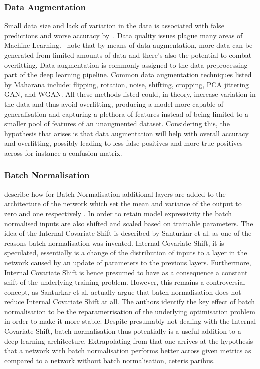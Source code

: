 \subsubsection{Data Augmentation}\label{augmentationtheory}
Small data size and lack of variation in the data is associated with false predictions and worse accuracy by~\citeauthor{maharana2022review}. Data quality issues plague many areas of Machine Learning.~\citeauthor{maharana2022review} note that by means of data augmentation, more data can be generated from limited amounts of data and there's also the potential to combat overfitting. Data augmentation is commonly assigned to the data preprocessing part of the deep learning pipeline. Common data augmentation techniques listed by Maharana include: flipping, rotation, noise, shifting, cropping, PCA jittering GAN, and WGAN\@. All these methods listed could, in theory, increase variation in the data and thus avoid overfitting, producing a model more capable of generalisation and capturing a plethora of features instead of being limited to a smaller pool of features of an unaugmented dataset. Considering this, the hypothesis that arises is that data augmentation will help with overall accuracy and overfitting, possibly leading to less false positives and more true positives across for instance a confusion matrix\@.

\subsubsection{Batch Normalisation}\label{batchnormtheory}
\citeauthor{santurkar2018does} describe how for Batch Normalisation additional layers are added to the architecture of the network which set the mean and variance of the output to zero and one respectively \citep{santurkar2018does}. In order to retain model expressivity the batch normalised inputs are also shifted and scaled based on trainable parameters. The idea of the Internal Covariate Shift is described by Santurkar et al\@. as one of the reasons batch normalisation was invented. Internal Covariate Shift, it is speculated, essentially is a change of the distribution of inputs to a layer in the network caused by an update of parameters to the previous layers. Furthermore, Internal Covariate Shift is hence presumed to have as a consequence a constant shift of the underlying training problem. However, this remains a controversial concept, as Santurkar et al\@. actually argue that batch normalisation does not reduce Internal Covariate Shift at all. The authors identify the key effect of batch normalisation to be the reparametrisation of the underlying optimisation problem in order to make it more stable. Despite presumably not dealing with the Internal Covariate Shift, batch normalisation thus potentially is a useful addition to a deep learning architecture. Extrapolating from that one arrives at the hypothesis that a network with batch normalisation performs better across given metrics as compared to a network without batch normalisation, ceteris paribus.


